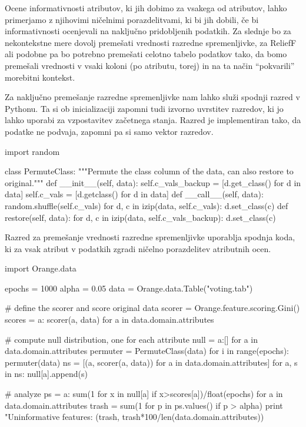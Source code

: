 Ocene informativnosti atributov, ki jih dobimo za vsakega od atributov, lahko primerjamo z njihovimi ničelnimi porazdelitvami, ki bi jih dobili, če bi informativnosti ocenjevali na naključno pridobljenih podatkih. Za slednje bo za nekontekstne mere dovolj premešati vrednosti razredne spremenljivke, za ReliefF ali podobne pa bo potrebno premešati celotno tabelo podatkov tako, da bomo premešali vrednosti v vsaki koloni (po atributu, torej) in na ta način ``pokvarili'' morebitni kontekst.

Za naključno premešanje razredne spremenljivke nam lahko služi spodnji razred v Pythonu. Ta si ob inicializaciji zapomni tudi izvorno uvrstitev razredov, ki jo lahko uporabi za vzpostavitev začetnega stanja. Razred je implementiran tako, da podatke ne podvaja, zapomni pa si samo vektor razredov.

\begin{python}
import random

class PermuteClass:
    """Permute the class column of the data, can also restore to original."""
    def __init__(self, data):
        self.c_vals_backup = [d.get_class() for d in data]
        self.c_vals = [d.getclass() for d in data]
    def __call__(self, data):
        random.shuffle(self.c_vals)
        for d, c in izip(data, self.c_vals):
            d.set_class(c)
    def restore(self, data):
        for d, c in izip(data, self.c_vals_backup):
            d.set_class(c)
\end{python}

Razred za premešanje vrednosti razredne spremenljivke uporablja spodnja koda, ki za vsak atribut v podatkih zgradi ničelno porazdelitev atributnih ocen.

\begin{python}
import Orange.data

epochs = 1000
alpha = 0.05
data = Orange.data.Table("voting.tab")

# define the scorer and score original data
scorer = Orange.feature.scoring.Gini()
scores = {a: scorer(a, data) for a in data.domain.attributes}

# compute null distribution, one for each attribute
null = {a:[] for a in data.domain.attributes}
permuter = PermuteClass(data)
for i in range(epochs):
    permuter(data)
    ns = [(a, scorer(a, data)) for a in data.domain.attributes]
    for a, s in ns:
        null[a].append(s)

# analyze
ps = {a: sum(1 for x in null[a] if x>scores[a])/float(epochs)
      for a in data.domain.attributes}
trash = sum(1 for p in ps.values() if p > alpha)
print "Uninformative features: %
    (trash, trash*100/len(data.domain.attributes))
\end{python}

